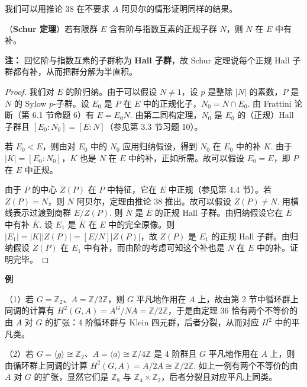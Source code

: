 我们可以用推论 38 在不要求 \(A\) 阿贝尔的情形证明同样的结果。

\begin{theorem}\label{thm:17.39}
（\textbf{Schur 定理}）若有限群 \(E\) 含有阶与指数互素的正规子群 \(N\)，则 \(N\) 在 \(E\) 中有补。
\end{theorem}

\noindent\textbf{注：} 回忆阶与指数互素的子群称为 \textbf{Hall 子群}，故 Schur 定理说每个正规 Hall 子群都有补，从而把群分解为半直积。

\begin{proof}
我们对 \(E\) 的阶归纳。由于可以假设 \(N \neq 1\)，设 \(p\) 是整除 \(|N|\) 的素数，\(P\) 是 \(N\) 的 Sylow \(p\)-子群。设 \(E_0\) 是 \(P\) 在 \(E\) 中的正规化子，\(N_0 = N \cap E_0\). 由 Frattini 论断（第 6.1 节命题 6）有 \(E = E_0N\). 由第二同构定理，\(N_0\) 是 \(E_0\) 的（正规）Hall 子群且 \([E_0:N_0] = [E:N]\)（参见第 3.3 节习题 10）。

若 \(E_0 < E\)，则由对 \(E_0\) 中的 \(N_0\) 应用归纳假设，得到 \(N_0\) 在 \(E_0\) 中的补 \(K\). 由于 \(|K| = [E_0:N_0]\)，\(K\) 也是 \(N\) 在 \(E\) 中的补，正如所需。故可以假设 \(E_0 = E\)，即 \(P\) 在 \(E\) 中正规。

由于 \(P\) 的中心 \(Z(P)\) 在 \(P\) 中特征，它在 \(E\) 中正规（参见第 4.4 节）。若 \(Z(P) = N\)，则 \(N\) 阿贝尔，定理由推论 38 推出。故可以假设 \(Z(P) \neq N\). 用横线表示过渡到商群 \(E/Z(P)\). 则 \(\bar N\) 是 \(\bar E\) 的正规 Hall 子群。由归纳假设它在 \(\bar E\) 中有补 \(\bar K\). 设 \(E_1\) 是 \(\bar K\) 在 \(E\) 中的完全原像。则 \(|E_1| = |K||Z(P)| = [E/N]|Z(P)|\)，故 \(Z(P)\) 是 \(E_1\) 的正规 Hall 子群。由归纳假设 \(Z(P)\) 在 \(E_1\) 中有补，而由阶的考虑可知这个补也是 \(N\) 在 \(E\) 中的补。证明完毕。
\end{proof}

\noindent\textbf{例}

（1）若 \(G = \mathbb{Z}_2\)、\(A = \mathbb{Z}/2\mathbb{Z}\)，则 \(G\) 平凡地作用在 \(A\) 上，故由第 2 节中循环群上同调的计算有 \(H^2(G, A) = A^G/NA = \mathbb{Z}/2\mathbb{Z}\)，于是由定理 36 恰有两个不等价的由 \(A\) 对 \(G\) 的扩张：4 阶循环群与 Klein 四元群，后者分裂，从而对应 \(H^2\) 中的平凡类。

（2）若 \(G = \langle g\rangle \cong \mathbb{Z}_2\)、\(A = \langle a\rangle \cong \mathbb{Z}/4\mathbb{Z}\) 是 4 阶群且 \(G\) 平凡地作用在 \(A\) 上，则由循环群上同调的计算 \(H^2(G, A) = A/2A \cong \mathbb{Z}/2\mathbb{Z}\). 如上一例有两个不等价的由 \(A\) 对 \(G\) 的扩张，显然它们是 \(\mathbb{Z}_8\) 与 \(\mathbb{Z}_4 \times \mathbb{Z}_2\)，后者分裂且对应平凡上同类。

